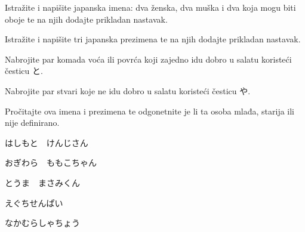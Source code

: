 
\author{Tomislav Mamić, Željka Ludošan}

	
	\begin{mondai}{}
		\item Istražite i napišite japanska imena: dva ženska, dva muška i dva koja mogu biti oboje te na njih dodajte prikladan nastavak.
		\item Istražite i napišite tri japanska prezimena te na njih dodajte prikladan nastavak.
		\item Nabrojite par komada voća ili povrća koji zajedno idu dobro u salatu koristeći česticu と.
		\item Nabrojite par stvari koje ne idu dobro u salatu koristeći česticu や.
	\end{mondai}
	
	\begin{mondai}{Pročitajte ova imena i prezimena te odgonetnite je li ta osoba mlađa, starija ili nije definirano.}
		\item はしもと　けんじさん
		\item おぎわら　ももこちゃん
		\item とうま　まさみくん
		\item えぐちせんぱい
		\item なかむらしゃちょう
	\end{mondai}

	
